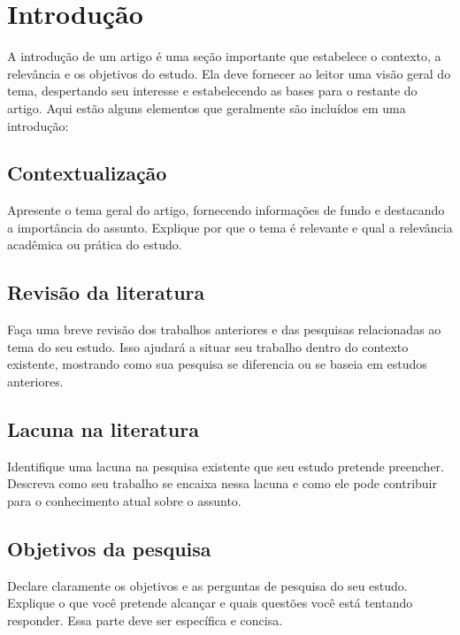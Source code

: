 \section{Introdução}

A introdução de um artigo é uma seção importante que estabelece o contexto, a relevância e os objetivos do estudo. Ela deve fornecer ao leitor uma visão geral do tema, despertando seu interesse e estabelecendo as bases para o restante do artigo. Aqui estão alguns elementos que geralmente são incluídos em uma introdução:

\subsection{Contextualização}
Apresente o tema geral do artigo, fornecendo informações de fundo e destacando a importância do assunto. Explique por que o tema é relevante e qual a relevância acadêmica ou prática do estudo.

\subsection{Revisão da literatura}
Faça uma breve revisão dos trabalhos anteriores e das pesquisas relacionadas ao tema do seu estudo. Isso ajudará a situar seu trabalho dentro do contexto existente, mostrando como sua pesquisa se diferencia ou se baseia em estudos anteriores.

\subsection{Lacuna na literatura}
Identifique uma lacuna na pesquisa existente que seu estudo pretende preencher. Descreva como seu trabalho se encaixa nessa lacuna e como ele pode contribuir para o conhecimento atual sobre o assunto.

\subsection{Objetivos da pesquisa}
Declare claramente os objetivos e as perguntas de pesquisa do seu estudo. Explique o que você pretende alcançar e quais questões você está tentando responder. Essa parte deve ser específica e concisa.

